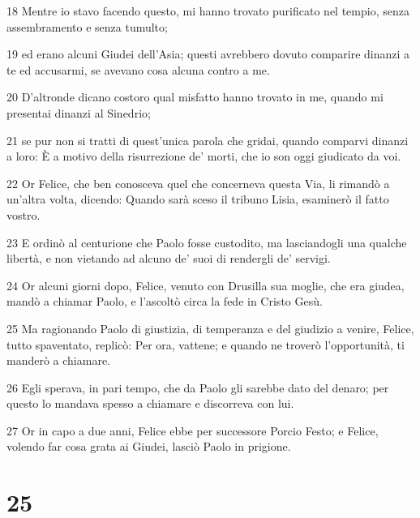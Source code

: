 \par 18 Mentre io stavo facendo questo, mi hanno trovato purificato nel tempio, senza assembramento e senza tumulto;
\par 19 ed erano alcuni Giudei dell'Asia; questi avrebbero dovuto comparire dinanzi a te ed accusarmi, se avevano cosa alcuna contro a me.
\par 20 D'altronde dicano costoro qual misfatto hanno trovato in me, quando mi presentai dinanzi al Sinedrio;
\par 21 se pur non si tratti di quest'unica parola che gridai, quando comparvi dinanzi a loro: È a motivo della risurrezione de' morti, che io son oggi giudicato da voi.
\par 22 Or Felice, che ben conosceva quel che concerneva questa Via, li rimandò a un'altra volta, dicendo: Quando sarà sceso il tribuno Lisia, esaminerò il fatto vostro.
\par 23 E ordinò al centurione che Paolo fosse custodito, ma lasciandogli una qualche libertà, e non vietando ad alcuno de' suoi di rendergli de' servigi.
\par 24 Or alcuni giorni dopo, Felice, venuto con Drusilla sua moglie, che era giudea, mandò a chiamar Paolo, e l'ascoltò circa la fede in Cristo Gesù.
\par 25 Ma ragionando Paolo di giustizia, di temperanza e del giudizio a venire, Felice, tutto spaventato, replicò: Per ora, vattene; e quando ne troverò l'opportunità, ti manderò a chiamare.
\par 26 Egli sperava, in pari tempo, che da Paolo gli sarebbe dato del denaro; per questo lo mandava spesso a chiamare e discorreva con lui.
\par 27 Or in capo a due anni, Felice ebbe per successore Porcio Festo; e Felice, volendo far cosa grata ai Giudei, lasciò Paolo in prigione.

\chapter{25}

